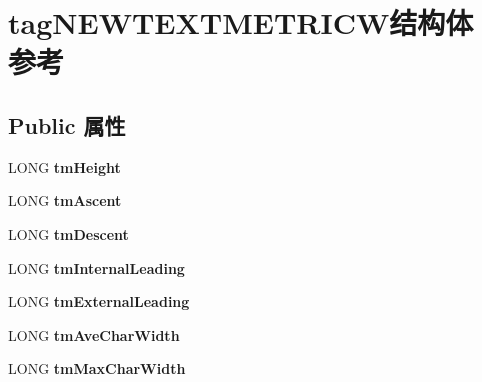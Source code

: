 \hypertarget{structtag_n_e_w_t_e_x_t_m_e_t_r_i_c_w}{}\section{tag\+N\+E\+W\+T\+E\+X\+T\+M\+E\+T\+R\+I\+C\+W结构体 参考}
\label{structtag_n_e_w_t_e_x_t_m_e_t_r_i_c_w}
\subsection*{Public 属性}
\begin{DoxyCompactItemize}
\item 
\mbox{\label{structtag_n_e_w_t_e_x_t_m_e_t_r_i_c_w_a05729b046269f7bf537cbf3e9b3c8179}} 
L\+O\+NG {\bfseries tm\+Height}
\item 
\mbox{\label{structtag_n_e_w_t_e_x_t_m_e_t_r_i_c_w_adfb08d053f9e97ca6d2b683ad326c914}} 
L\+O\+NG {\bfseries tm\+Ascent}
\item 
\mbox{\label{structtag_n_e_w_t_e_x_t_m_e_t_r_i_c_w_aebcb8610edca40b450852e47cda5f944}} 
L\+O\+NG {\bfseries tm\+Descent}
\item 
\mbox{\label{structtag_n_e_w_t_e_x_t_m_e_t_r_i_c_w_a83073be152c7493a02ae1a3abdbc4cb9}} 
L\+O\+NG {\bfseries tm\+Internal\+Leading}
\item 
\mbox{\label{structtag_n_e_w_t_e_x_t_m_e_t_r_i_c_w_accdf89dcc25cf1a43d6ccaf1ee710e98}} 
L\+O\+NG {\bfseries tm\+External\+Leading}
\item 
\mbox{\label{structtag_n_e_w_t_e_x_t_m_e_t_r_i_c_w_a9568944e290daedbe3d8658e13dc7e6a}} 
L\+O\+NG {\bfseries tm\+Ave\+Char\+Width}
\item 
\mbox{\label{structtag_n_e_w_t_e_x_t_m_e_t_r_i_c_w_a8ea4bd6b5b4efd7d972a3146d7e47116}} 
L\+O\+NG {\bfseries tm\+Max\+Char\+Width}
\item 
\mbox{\label{structtag_n_e_w_t_e_x_t_m_e_t_r_i_c_w_aa2bbfef279a5d03a761f6b73ef40cbce}} 

\end{DoxyCompactItemize}
